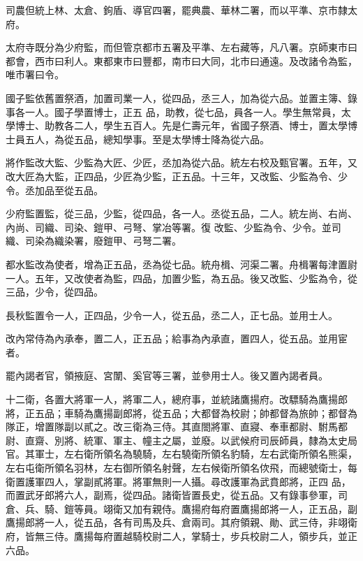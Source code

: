 \begin{pinyinscope}
 司農但統上林、太倉、鉤盾、導官四署，罷典農、華林二署，而以平準、京市隸太府。



 太府寺既分為少府監，而但管京都市五署及平準、左右藏等，凡八署。京師東市曰都會，西市曰利人。東都東市曰豐都，南市曰大同，北市曰通遠。及改諸令為監，唯市署曰令。



 國子監依舊置祭酒，加置司業一人，從四品，丞三人，加為從六品。並置主簿、錄事各一人。國子學置博士，正五
 品，助教，從七品，員各一人。學生無常員，太學博士、助教各二人，學生五百人。先是仁壽元年，省國子祭酒、博士，置太學博士員五人，為從五品，總知學事。至是太學博士降為從六品。



 將作監改大監、少監為大匠、少匠，丞加為從六品。統左右校及甄官署。五年，又改大匠為大監，正四品，少匠為少監，正五品。十三年，又改監、少監為令、少令。丞加品至從五品。



 少府監置監，從三品，少監，從四品，各一人。丞從五品，二人。統左尚、右尚、內尚、司織、司染、鎧甲、弓弩、掌冶等署。復
 改監、少監為令、少令。並司織、司染為織染署，廢鎧甲、弓弩二署。



 都水監改為使者，增為正五品，丞為從七品。統舟楫、河渠二署。舟楫署每津置尉一人。五年，又改使者為監，四品，加置少監，為五品。後又改監、少監為令，從三品，少令，從四品。



 長秋監置令一人，正四品，少令一人，從五品，丞二人，正七品。並用士人。



 改內常侍為內承奉，置二人，正五品；給事為內承直，置四人，從五品。並用宦者。



 罷內謁者官，領掖庭、宮闈、奚官等三署，並參用士人。後又置內謁者員。



 十二衛，各置大將軍一人，將軍二人，總府事，並統諸鷹揚府。改驃騎為鷹揚郎將，正五品；車騎為鷹揚副郎將，從五品；大都督為校尉；帥都督為旅帥；都督為隊正，增置隊副以貳之。改三衛為三侍。其直閤將軍、直寢、奉車都尉、駙馬都尉、直齋、別將、統軍、軍主、幢主之屬，並廢。以武候府司辰師員，隸為太史局官。其軍士，左右衛所領名為驍騎，左右驍衛所領名豹騎，左右武衛所領名熊渠，左右屯衛所領名羽林，左右御所領名射聲，左右候衛所領名佽飛，而總號衛士，每衛置護軍四人，掌副貳將軍。將軍無則一人攝。尋改護軍為武賁郎將，正四
 品，而置武牙郎將六人，副焉，從四品。諸衛皆置長史，從五品。又有錄事參軍，司倉、兵、騎、鎧等員。翊衛又加有親侍。鷹揚府每府置鷹揚郎將一人，正五品，副鷹揚郎將一人，從五品，各有司馬及兵、倉兩司。其府領親、勛、武三侍，非翊衛府，皆無三侍。鷹揚每府置越騎校尉二人，掌騎士，步兵校尉二人，領步兵，並正六品。




\end{pinyinscope}
